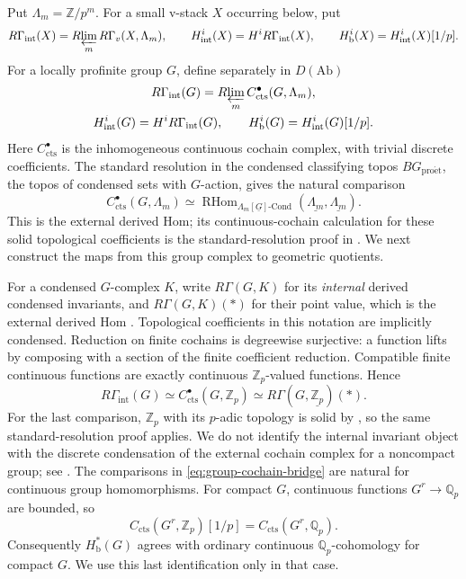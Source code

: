 \documentclass[11pt]{article}
\numberwithin{equation}{section}
\theoremstyle{definition}
\theoremstyle{remark}
\begin{document}
Put $\Lambda_m=\mathbb Z/p^m$.  For a small v-stack $X$ occurring below, put
\[
 R\Gamma_{\mathrm{int}}(X)
   =R\!\varprojlim_m R\Gamma_v(X,\Lambda_m),\qquad
 H^i_{\mathrm{int}}(X)=H^iR\Gamma_{\mathrm{int}}(X),\qquad
 H^i_{\mathrm b}(X)=H^i_{\mathrm{int}}(X)[1/p].
\]
For a locally profinite group $G$, define separately in $D(\mathrm{Ab})$
\begin{equation}\label{eq:integral-group-cochains}
\begin{gathered}
 R\Gamma_{\mathrm{int}}(G)=R\!\varprojlim_m C_{\mathrm{cts}}^{\bullet}(G,\Lambda_m),
 \\
 H^i_{\mathrm{int}}(G)=H^iR\Gamma_{\mathrm{int}}(G),
 \qquad H^i_{\mathrm b}(G)=H^i_{\mathrm{int}}(G)[1/p].
\end{gathered}
\end{equation}
Here $C_{\mathrm{cts}}^{\bullet}$ is the inhomogeneous continuous cochain complex,
with trivial discrete coefficients.  The standard resolution in the
condensed classifying topos $BG_{\mathrm{pro\acute et}}$, the topos of
condensed sets with $G$-action, gives the natural comparison
\[
 C_{\mathrm{cts}}^{\bullet}(G,\Lambda_m)\simeq
 \operatorname{RHom}_{\Lambda_m[\underline G]\text{-}\mathrm{Cond}}
       (\underline{\Lambda_m},\underline{\Lambda_m}).
\]
This is the external derived Hom; its continuous-cochain calculation for
these solid topological coefficients is the standard-resolution proof in
\cite[\S2, pp.~5--7, Lemmas~2.1--2.2]{Anschutz2020}.
We next construct the maps from this group complex to geometric quotients.

For a condensed $G$-complex $K$, write $R\Gamma(G,K)$ for its
\emph{internal} derived condensed invariants, and $R\Gamma(G,K)(*)$
for their point value, which is the external derived Hom
\cite[\S2, p.~8]{Anschutz2020}.  Topological coefficients in this
notation are implicitly condensed.  Reduction on finite cochains is
degreewise surjective: a function lifts by composing with a section of
the finite coefficient reduction.  Compatible finite continuous
functions are exactly continuous $\mathbb Z_p$-valued functions.  Hence
\begin{equation}\label{eq:group-cochain-bridge}
 R\Gamma_{\mathrm{int}}(G)\simeq C_{\mathrm{cts}}^{\bullet}(G,\mathbb Z_p)
       \simeq R\Gamma(G,\underline{\mathbb Z_p})(*).
\end{equation}
For the last comparison, $\mathbb Z_p$ with its $p$-adic topology is solid by
\cite[\S1, pp.~4--5]{Anschutz2020}, so the same standard-resolution
proof applies.  We do not identify the internal invariant object with
the discrete condensation of the external cochain complex for a
noncompact group; see \cite[Lemma~2.5 and Remark~2.6]{Anschutz2020}.
The comparisons in \eqref{eq:group-cochain-bridge} are natural for
continuous group homomorphisms.
For compact $G$, continuous functions $G^r\to\mathbb Q_p$ are bounded, so
\[
 C_{\mathrm{cts}}(G^r,\mathbb Z_p)[1/p]=C_{\mathrm{cts}}(G^r,\mathbb Q_p).
\]
Consequently $H^*_{\mathrm b}(G)$ agrees with ordinary continuous
$\mathbb Q_p$-cohomology for compact $G$.  We use this last identification
only in that case.
\end{document}

